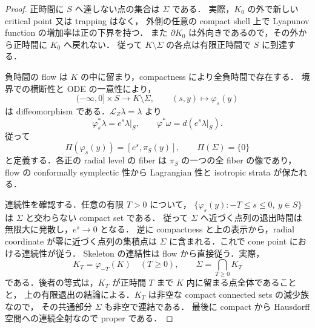 \begin{proof}
正時間に $S$ へ達しない点の集合は $\Sigma$ である．
実際，$K_0$ の外で新しい critical point 又は trapping はなく，
外側の任意の compact shell 上で Lyapunov function の増加率は正の下界を持つ．
また $\partial K_0$ は外向きであるので，その外から正時間に $K_0$ へ戻れない．
従って $K\setminus\Sigma$ の各点は有限正時間で $S$ に到達する．

負時間の flow は $K$ の中に留まり，compactness により全負時間で存在する．
境界での横断性と ODE の一意性により，
\[
 (-\infty,0]\times S\longrightarrow K\setminus\Sigma,
 \qquad(s,y)\longmapsto\varphi_s(y)
\]
は diffeomorphism である．$\mathcal L_Z\lambda=\lambda$ より
\[
 \varphi_s^*\lambda=e^s\lambda|_S,\qquad
 \varphi^*\omega=d(e^s\lambda|_S).
\]
従って
\[
 \Pi(\varphi_s(y))=[e^s,\pi_S(y)],\qquad \Pi(\Sigma)=\{0\}
\]
と定義する．各正の radial level の fiber は $\pi_S$ の一つの全 fiber の像であり，
flow の conformally symplectic 性から Lagrangian 性と isotropic strata が保たれる．

連続性を確認する．任意の有限 $T>0$ について，
$\{\varphi_s(y):-T\le s\le0,\ y\in S\}$ は $\Sigma$ と交わらない compact set である．
従って $\Sigma$ へ近づく点列の退出時間は無限大に発散し，$e^s\to0$ となる．
逆に compactness と上の表示から，radial coordinate が零に近づく点列の集積点は
$\Sigma$ に含まれる．これで cone point における連続性が従う．
Skeleton の連結性は flow から直接従う．実際，
\[
 K_T=\varphi_{-T}(K)\quad(T\ge0),\qquad
 \Sigma=\bigcap_{T\ge0}K_T
\]
である．後者の等式は，$K_T$ が正時間 $T$ まで $K$ 内に留まる点全体であることと，
上の有限退出の結論による．$K_T$ は非空な compact connected sets の減少族なので，
その共通部分 $\Sigma$ も非空で連結である．
最後に compact から Hausdorff 空間への連続全射なので proper である．
\end{proof}

